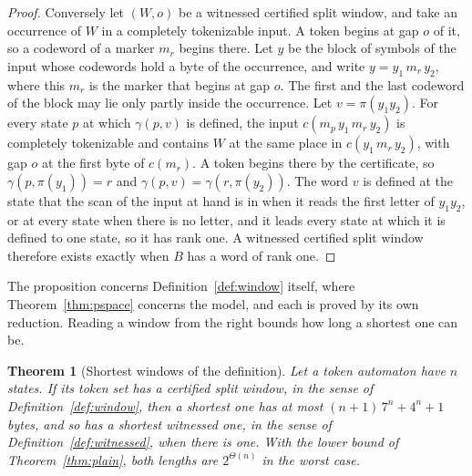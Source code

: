\documentclass[11pt,a4paper]{article}
\theoremstyle{definition}
\theoremstyle{plain}
\newtheorem{theorem}{Theorem}
\begin{document}
\begin{proof}
Conversely let $(W, o)$ be a witnessed certified split window, and take an occurrence of $W$ in a completely tokenizable
input. A token begins at gap $o$ of it, so a codeword of a marker $m_r$ begins there. Let $y$ be the block of symbols of
the input whose codewords hold a byte of the occurrence, and write $y = y_1\, m_r\, y_2$, where this $m_r$ is the marker
that begins at gap $o$. The first and the last codeword of the block may lie only partly inside the occurrence. Let
$v = \pi(y_1 y_2)$. For every state $p$ at which $\gamma(p, v)$ is defined, the input $c(m_p\, y_1\, m_r\, y_2)$ is
completely tokenizable and contains $W$ at the same place in $c(y_1\, m_r\, y_2)$, with gap $o$ at the first byte of
$c(m_r)$. A token begins there by the certificate, so $\gamma(p, \pi(y_1)) = r$ and
$\gamma(p, v) = \gamma(r, \pi(y_2))$. The word $v$ is defined at the state that the scan of the input at hand is in when
it reads the first letter of $y_1 y_2$, or at every state when there is no letter, and it leads every state at which it
is defined to one state, so it has rank one. A witnessed certified split window therefore exists exactly when $B$ has a
word of rank one.
\end{proof}

The proposition concerns Definition~\ref{def:window} itself, where Theorem~\ref{thm:pspace} concerns the model, and each
is proved by its own reduction. Reading a window from the right bounds how long a shortest one can be.

\begin{theorem}[Shortest windows of the definition]
\label{thm:semantic-length}
Let a token automaton have $n$ states. If its token set has a certified split window, in the sense of
Definition~\ref{def:window}, then a shortest one has at most $(n + 1)\, 7^n + 4^n + 1$ bytes, and so has a shortest
witnessed one, in the sense of Definition~\ref{def:witnessed}, when there is one. With the lower bound of
Theorem~\ref{thm:plain}, both lengths are $2^{\Theta(n)}$ in the worst case.
\end{theorem}
\end{document}
